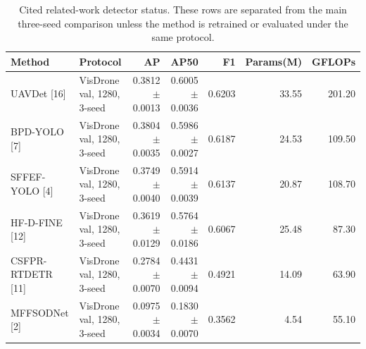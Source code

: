 \begin{table}[t]
\centering
\scriptsize
\setlength{\tabcolsep}{3pt}
\caption{Cited related-work detector status. These rows are separated from the main three-seed comparison unless the method is retrained or evaluated under the same protocol.}
\label{tab:cited_related_detector_status}
\begin{tabular}{@{}llrrrrr@{}}
\toprule
Method & Protocol & AP & AP50 & F1 & Params(M) & GFLOPs \\
\midrule
UAVDet [16] & VisDrone val, 1280, 3-seed & 0.3812 $\pm$ 0.0013 & 0.6005 $\pm$ 0.0036 & 0.6203 & 33.55 & 201.20 \\
BPD-YOLO [7] & VisDrone val, 1280, 3-seed & 0.3804 $\pm$ 0.0035 & 0.5986 $\pm$ 0.0027 & 0.6187 & 24.53 & 109.50 \\
SFFEF-YOLO [4] & VisDrone val, 1280, 3-seed & 0.3749 $\pm$ 0.0040 & 0.5914 $\pm$ 0.0039 & 0.6137 & 20.87 & 108.70 \\
HF-D-FINE [12] & VisDrone val, 1280, 3-seed & 0.3619 $\pm$ 0.0129 & 0.5764 $\pm$ 0.0186 & 0.6067 & 25.48 & 87.30 \\
CSFPR-RTDETR [11] & VisDrone val, 1280, 3-seed & 0.2784 $\pm$ 0.0070 & 0.4431 $\pm$ 0.0094 & 0.4921 & 14.09 & 63.90 \\
MFFSODNet [2] & VisDrone val, 1280, 3-seed & 0.0975 $\pm$ 0.0034 & 0.1830 $\pm$ 0.0070 & 0.3562 & 4.54 & 55.10 \\
\bottomrule
\end{tabular}
\end{table}

